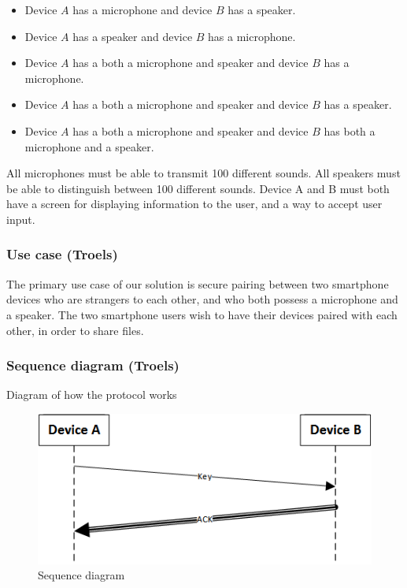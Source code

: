 \documentclass[12pt]{article}
\begin{document}
\begin{itemize}
    \item Device $A$ has a microphone and device $B$ has a speaker.
    \item Device $A$ has a speaker and device $B$ has a microphone.
    \item Device $A$ has a both a microphone and speaker and device $B$ has a microphone.
    \item Device $A$ has a both a microphone and speaker and device $B$ has a speaker.
    \item Device $A$ has a both a microphone and speaker and device $B$ has both a microphone and a speaker.
\end{itemize}

All microphones must be able to transmit 100 different sounds.
All speakers must be able to distinguish between 100 different sounds.
Device A and B must both have a screen for displaying information to the user, and a way to accept user input.

\subsubsection{Use case (Troels)}
\label{subs:Use case}

The primary use case of our solution is secure pairing between two smartphone devices who are strangers to each other, and who both possess a microphone and a speaker.
The two smartphone users wish to have their devices paired with each other, in order to share files.
\fi
\subsubsection{Sequence diagram (Troels)}
\label{subs:Sequence diagram}

Diagram of how the protocol works

\begin{figure}[h!]
    \includegraphics[scale=1]{fig/sequence.png}
    \caption{Sequence diagram}
\end{figure}
\end{document}
